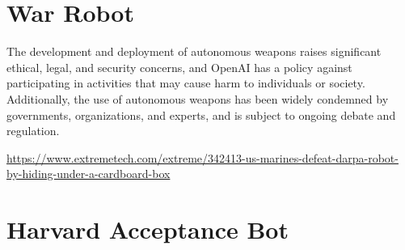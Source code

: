 \section{War Robot}


The development and deployment of autonomous weapons raises significant ethical, legal, and security concerns, and OpenAI has a policy against participating in activities that may cause harm to individuals or society. Additionally, the use of autonomous weapons has been widely condemned by governments, organizations, and experts, and is subject to ongoing debate and regulation.

\url{https://www.extremetech.com/extreme/342413-us-marines-defeat-darpa-robot-by-hiding-under-a-cardboard-box}

\section{Harvard Acceptance Bot}

